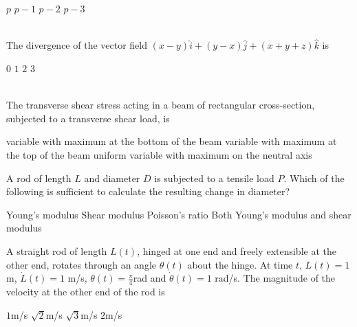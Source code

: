 \documentclass[addpoints,11pt]{exam}
\begin{document}
\begin{questions}
    \begin{oneparchoices}
        \choice $p$
        \choice $p-1$
        \choice $p-2$
        \choice $p-3$
    \end{oneparchoices}\\

    \question The divergence of the vector field $(x-y)\hat{i} + (y-x)\hat{j} + (x+y+z)\hat{k}$ is\\
    
    \begin{oneparchoices}
        \choice $0$
        \choice $1$
        \choice $2$
        \choice $3$
    \end{oneparchoices}\\

    \question The transverse shear stress acting in a beam of rectangular cross-section, subjected to a transverse shear load, is\\

    \begin{choices}
        \choice variable with maximum at the bottom of the beam
        \choice variable with maximum at the top of the beam
        \choice uniform
        \choice variable with maximum on the neutral axis
    \end{choices}
\pagebreak

\question A rod of length $L$ and diameter $D$ is subjected to a tensile load $P$. Which of the following is sufficient to calculate the resulting change in diameter?\\

\begin{choices}
        \choice Young's modulus
        \choice Shear modulus
        \choice Poisson's ratio
        \choice Both Young's modulus and shear modulus
    \end{choices}

    \question A straight rod of length $L(t)$, hinged at one end and freely extensible at the other end, rotates through an angle $\theta(t)$ about the hinge. At time $t$, $L(t)=1$ m, $\dot{L}(t)=1$ m/s, $\theta(t)=\frac{\pi}{4}$rad and $\dot{\theta}(t)=1$ rad/s. The magnitude of the velocity at the other end of the rod is\\

    \begin{oneparchoices}
        \choice $1$m/s
        \choice $\sqrt{2}$m/s
        \choice $\sqrt{3}$m/s
        \choice $2$m/s
    \end{oneparchoices}\\
    

\end{questions}
\end{document}
